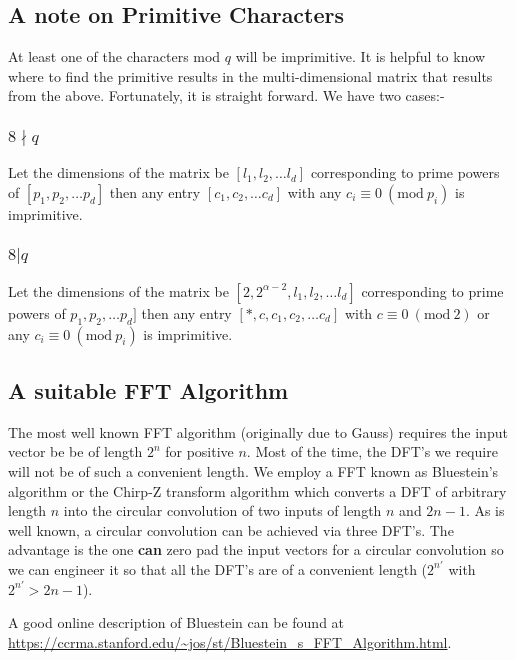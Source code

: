 \documentclass[12pt]{amsart}
\newcommand{\Mod}[1]{\ (\mathrm{mod}\ #1)}
\theoremstyle{remark}
\numberwithin{theorem}{section}
\numberwithin{equation}{section}
\begin{document}
\subsection{A note on Primitive Characters}

At least one of the characters mod $q$ will be imprimitive. It is helpful to know where to find the primitive results in the multi-dimensional matrix that results from the above. Fortunately, it is straight forward. We have two cases:-


\subsubsection{$8\nmid q$}

Let the dimensions of the matrix be $[l_1,l_2,\ldots l_d]$ corresponding to prime powers of $[p_1,p_2,\ldots p_d]$ then any entry $[c_1,c_2,\ldots c_d]$ with any $c_i\equiv 0 \Mod{p_i}$ is imprimitive.

\subsubsection{$8 | q$}

Let the dimensions of the matrix be $[2,2^{\alpha-2},l_1,l_2,\ldots l_d]$ corresponding to prime powers of $p_1,p_2,\ldots p_d]$ then any entry $[*,c,c_1,c_2,\ldots c_d]$ with $c\equiv 0 \Mod{2}$ or any $c_i\equiv 0 \Mod{p_i}$ is imprimitive.




  \subsection{A suitable FFT Algorithm}\label{sub:bluestein}

The most well known FFT algorithm (originally due to Gauss) requires the input vector be be of length $2^n$ for positive $n$. Most of the time, the DFT's we require will not be of such a convenient length. We employ a FFT known as Bluestein's algorithm or the Chirp-Z transform algorithm which converts a DFT of arbitrary length $n$ into the circular convolution of two inputs of length $n$ and $2n-1$. As is well known, a circular convolution can be achieved via three DFT's. The advantage is the one \textbf{can} zero pad the input vectors for a circular convolution so we can engineer it so that all the DFT's are of a convenient length ($2^{n'}$ with $2^{n'}>2n-1$).

A good online description of Bluestein can be found at \url{https://ccrma.stanford.edu/~jos/st/Bluestein_s_FFT_Algorithm.html}.



\end{document}
